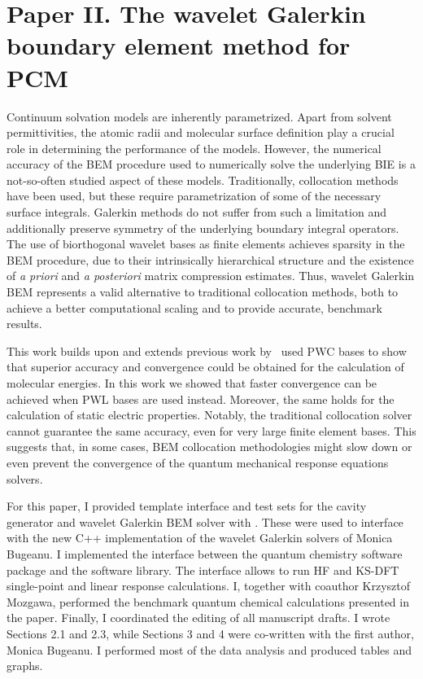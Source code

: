 \section*{Paper II. The wavelet Galerkin boundary element method for PCM}

Continuum solvation models are inherently parametrized. Apart from solvent permittivities,
the atomic radii and molecular surface definition play a crucial role
in determining the performance of the models.
However, the numerical accuracy of the \acs{BEM} procedure used to numerically solve the
underlying \acs{BIE} is a not-so-often studied aspect of these models.
Traditionally, collocation methods have been used, but these require parametrization of some of the necessary surface integrals.
Galerkin methods do not suffer from such a limitation and additionally preserve symmetry of the underlying
boundary integral operators.
The use of biorthogonal wavelet bases as finite elements achieves sparsity in
the \acs{BEM} procedure, due to their intrinsically hierarchical structure and
the existence of \emph{a priori} and \emph{a posteriori} matrix compression
estimates.
Thus, wavelet Galerkin \acs{BEM} represents a valid alternative to traditional collocation methods,
both to achieve a better computational scaling and to provide accurate, benchmark results.

This work builds upon and extends previous work by~\citeauthor{Weijo2010-hy}
\citeauthor{Weijo2010-hy} used \ac{PWC} bases to show that superior accuracy
and convergence could be obtained for the calculation of molecular energies.
In this work we showed that faster convergence can be achieved when \ac{PWL} bases are used instead.
Moreover, the same holds for the calculation of static electric properties.
Notably, the traditional collocation solver cannot guarantee the same accuracy,
even for very large finite element bases. This suggests that, in some cases,
\acs{BEM} collocation methodologies might slow down or even prevent the
convergence of the quantum mechanical response equations solvers.

For this paper, I provided template interface and test sets for the cavity
generator\autocite{Harbrecht2009-no, Harbrecht2011-dk}
and wavelet Galerkin \acs{BEM} solver\autocite{Harbrecht2004-uo, Harbrecht2006-ug, Dahmen2006-pj}
with \pcmsolver.
These were used to interface with the new C++ implementation of the wavelet
Galerkin solvers of Monica Bugeanu.
I implemented the interface between the \LSDALTON quantum chemistry software
package and the \pcmsolver software library. The interface allows to run \acs{HF} and
\acs{KS}-\acs{DFT} single-point and linear response calculations.
I, together with coauthor Krzysztof Mozgawa, performed the benchmark quantum
chemical calculations presented in the paper.
Finally, I coordinated the editing of all manuscript drafts. I wrote Sections 2.1 and 2.3,
while Sections 3 and 4 were co-written with the first author, Monica Bugeanu.
I performed most of the data analysis and produced tables and graphs.

